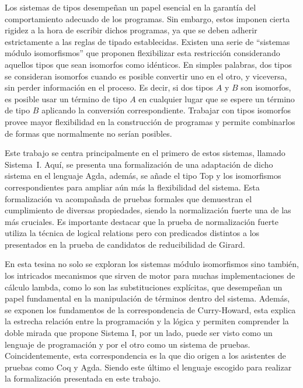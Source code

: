 Los sistemas de tipos desempeñan un papel esencial en la garantía del comportamiento adecuado de los programas.
Sin embargo, estos imponen cierta rigidez a la hora de escribir dichos programas, ya que se deben adherir estrictamente a las reglas de tipado establecidas.
Existen una serie de ``sistemas módulo isomorfismos'' \cite{system-i,lambda-plus,sip} que proponen flexibilizar esta restricción considerando aquellos tipos que sean isomorfos como idénticos.
En simples palabras, dos tipos se consideran isomorfos cuando es posible convertir uno en el otro, y viceversa, sin perder información en el proceso.
Es decir, si dos tipos $A$ y $B$ son isomorfos, es posible usar un término de tipo $A$ en cualquier lugar que se espere un término de tipo $B$ aplicando la conversión correspondiente.
Trabajar con tipos isomorfos provee mayor flexibilidad en la construcción de programas y permite combinarlos de formas que normalmente no serían posibles.

Este trabajo se centra principalmente en el primero de estos sistemas, llamado Sistema~I.
Aquí, se presenta una formalización de una adaptación de dicho sistema en el lenguaje Agda, además, se añade el tipo Top y los isomorfismos correspondientes para ampliar aún más la flexibilidad del sistema.
Esta formalización va acompañada de pruebas formales que demuestran el cumplimiento de diversas propiedades, siendo la normalización fuerte una de las más cruciales.
Es importante destacar que la prueba de normalización fuerte utiliza la técnica de logical relations pero con predicados distintos a los presentados en la prueba de candidatos de reducibilidad de Girard.

En esta tesina no solo se exploran los sistemas módulo isomorfismos sino también, los intricados mecanismos que sirven de motor para muchas implementaciones de cálculo lambda, como lo son las substituciones explícitas, que desempeñan un papel fundamental en la manipulación de términos dentro del sistema.
Además, se exponen los fundamentos de la correspondencia de Curry-Howard, esta explica la estrecha relación entre la programación y la lógica y permiten comprender la doble mirada que propone Sistema I, por un lado, puede ser visto como un lenguaje de programación y por el otro como un sistema de pruebas.
Coincidentemente, esta correspondencia es la que dio origen a los asistentes de pruebas como Coq y Agda.
Siendo este último el lenguaje escogido para realizar la formalización presentada en este trabajo.